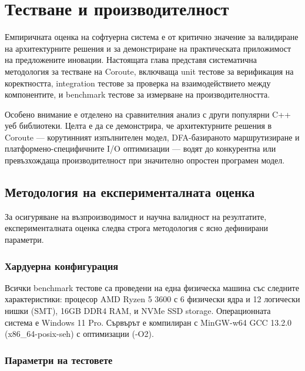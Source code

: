 \section{Тестване и производителност}
\label{sec:testing}

Емпиричната оценка на софтуерна система е от критично значение за валидиране на архитектурните решения и за демонстриране на практическата приложимост на предложените иновации. Настоящата глава представя систематична методология за тестване на Coroute, включваща unit тестове за верификация на коректността, integration тестове за проверка на взаимодействието между компонентите, и benchmark тестове за измерване на производителността.

Особено внимание е отделено на сравнителния анализ с други популярни C++ уеб библиотеки. Целта е да се демонстрира, че архитектурните решения в Coroute --- корутинният изпълнителен модел, DFA-базираното маршрутизиране и платформено-специфичните I/O оптимизации --- водят до конкурентна или превъзхождаща производителност при значително опростен програмен модел.

\subsection{Методология на експерименталната оценка}

За осигуряване на възпроизводимост и научна валидност на резултатите, експерименталната оценка следва строга методология с ясно дефинирани параметри.

\subsubsection{Хардуерна конфигурация}

Всички benchmark тестове са проведени на една физическа машина със следните характеристики: процесор AMD Ryzen 5 3600 с 6 физически ядра и 12 логически нишки (SMT), 16GB DDR4 RAM, и NVMe SSD storage. Операционната система е Windows 11 Pro. Сървърът е компилиран с MinGW-w64 GCC 13.2.0 (x86\_64-posix-seh) с оптимизации (-O2).

\subsubsection{Параметри на тестовете}

